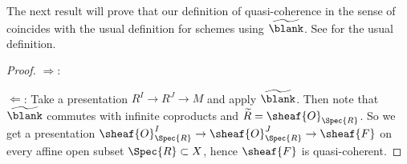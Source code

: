 The next result will prove that our definition of quasi-coherence in the sense of 
coincides with the usual definition for schemes using $\widetilde{\blank}$.
See \cite[13.2.2]{vakil} for the usual definition.


\begin{proof}
$\Rightarrow$:

$\Leftarrow$:
Take a presentation $R^I \rightarrow R^J \rightarrow M$
and apply $\widetilde{\blank}$. 
Then note that $\widetilde{\blank}$ commutes with infinite coproducts
and $\widetilde{R} = \sheaf{O}_{\Spec{R}}$.
So we get a presentation 
$\sheaf{O}_{\Spec{R}}^I \rightarrow \sheaf{O}_{\Spec{R}}^J \rightarrow \sheaf{F}$ 
on every affine open subset $\Spec{R}\subset X$, hence $\sheaf{F}$ is quasi-coherent.
\end{proof}